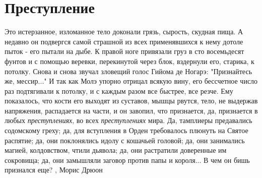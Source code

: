  
 
 
 
 
\chapter{Преступление}

Это истерзанное, изломанное тело доконали грязь, сырость, скудная пища. А
недавно он подвергся самой страшной из всех применявшихся к нему дотоле
пыток - его пытали на дыбе. К правой ноге привязали груз в сто восемьдесят
фунтов и с помощью веревки, перекинутой через блок, вздернули его, старика, к
потолку. Снова и снова звучал зловещий голос Гийома де Ногарэ: "Признайтесь
же, мессир..." И так как Молэ упорно отрицал всякую вину, его бессчетное
число раз подтягивали к потолку, и с каждым разом все быстрее, все резче. Ему
показалось, что кости его выходят из суставов, мышцы рвутся, тело, не
выдержав напряжения, распадается на части, и он завопил, что признается,
да, признается в любых \emph{преступлениях}, во всех \emph{преступлениях} мира. Да,
тамплиеры предавались содомскому греху; да, для вступления в Орден
требовалось плюнуть на Святое распятие; да, они поклонялись идолу с
кошачьей головой; да, они занимались магией, колдовством, чтили дьявола;
да, они растратили доверенные им сокровища; да, они замышляли заговор против
папы и короля... В чем он бишь признался еще?
, Морис Дрюон
